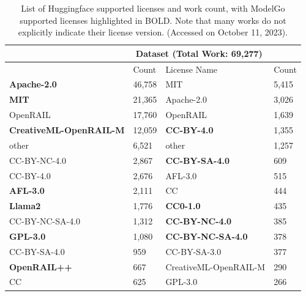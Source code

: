 \begin{table}[h]
  \caption{List of Huggingface supported licenses and work count, with ModelGo supported licenses highlighted in BOLD. Note that many works do not explicitly indicate their license version. (Accessed on October 11, 2023). }
  \scriptsize
  \label{tab:stats}
  \begin{tabular}{|ll||ll|}
  \hline
  \rowcolor[gray]{.8} 
  \multicolumn{2}{|c||}{Model (Total Work: 355,150)}     & \multicolumn{2}{c|}{Dataset (Total Work: 69,277)}   \\ \hline
  \rowcolor[gray]{.9} 
  \multicolumn{1}{|l|}{License Name} & Count & \multicolumn{1}{l|}{License Name} & Count \\ \hline
  \multicolumn{1}{|l|}{\textbf{Apache-2.0}} & 46,758 & \multicolumn{1}{l|}{MIT} & 5,415 \\ \hline
  \multicolumn{1}{|l|}{\textbf{MIT}} & 21,365 & \multicolumn{1}{l|}{Apache-2.0} & 3,026 \\ \hline %
  \multicolumn{1}{|l|}{OpenRAIL} & 17,760 & \multicolumn{1}{l|}{OpenRAIL} & 1,639 \\ \hline
  \multicolumn{1}{|l|}{\textbf{CreativeML-OpenRAIL-M}} & 12,059 & \multicolumn{1}{l|}{\textbf{CC-BY-4.0}} & 1,355 \\ \hline
  \multicolumn{1}{|l|}{other} & 6,521 & \multicolumn{1}{l|}{other} & 1,257 \\ \hline
  \multicolumn{1}{|l|}{CC-BY-NC-4.0} & 2,867 & \multicolumn{1}{l|}{\textbf{CC-BY-SA-4.0}} & 609 \\ \hline
  \multicolumn{1}{|l|}{CC-BY-4.0} & 2,676 & \multicolumn{1}{l|}{AFL-3.0} & 515 \\ \hline
  \multicolumn{1}{|l|}{\textbf{AFL-3.0}} & 2,111 & \multicolumn{1}{l|}{CC} & 444 \\ \hline
  \multicolumn{1}{|l|}{\textbf{Llama2}} & 1,776 & \multicolumn{1}{l|}{\textbf{CC0-1.0}} & 435 \\ \hline
  \multicolumn{1}{|l|}{CC-BY-NC-SA-4.0} & 1,312 & \multicolumn{1}{l|}{\textbf{CC-BY-NC-4.0}} & 385 \\ \hline
  \multicolumn{1}{|l|}{\textbf{GPL-3.0}} & 1,080 & \multicolumn{1}{l|}{\textbf{CC-BY-NC-SA-4.0}} & 378 \\ \hline
  \multicolumn{1}{|l|}{CC-BY-SA-4.0} & 959 & \multicolumn{1}{l|}{CC-BY-SA-3.0} & 377 \\ \hline
  \multicolumn{1}{|l|}{\textbf{OpenRAIL++}} & 667 & \multicolumn{1}{l|}{CreativeML-OpenRAIL-M} & 290 \\ \hline
  \multicolumn{1}{|l|}{CC} & 625 & \multicolumn{1}{l|}{GPL-3.0} & 266 \\  \hline

\end{tabular}
\end{table}
